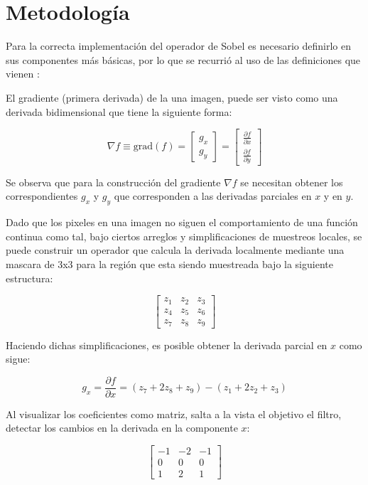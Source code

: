 \documentclass[11pt, letterpaper]{article}
\begin{document}
	\newpage
	
	\section{Metodología}
	
	Para la correcta implementación del operador de Sobel es necesario definirlo en sus componentes más básicas, por lo que se recurrió al uso de las definiciones que vienen \cite{gonzalez2018digital}:
	
	El gradiente (primera derivada) de la una imagen, puede ser visto como una derivada bidimensional que tiene la siguiente forma:
	
	$$\nabla f \equiv \text{grad}(f) = \begin{bmatrix} g_x \\ g_y \end{bmatrix} = \begin{bmatrix} \frac{\partial f}{\partial x} \\ \frac{\partial f}{\partial y} \end{bmatrix}$$
	
	Se observa que para la construcción del gradiente $\nabla f$ se necesitan obtener los correspondientes $g_x$ y $g_y$ que corresponden a las derivadas parciales en $x$ y en $y$.
	
	Dado que los pixeles en una imagen no siguen el comportamiento de una función continua como tal, bajo ciertos arreglos y simplificaciones de muestreos locales, se puede construir un operador que calcula la derivada localmente mediante una mascara de 3x3 para la región que esta siendo muestreada bajo la siguiente estructura:
	
	$$
	\begin{bmatrix}
		z_1 & z_2 & z_3 \\
		z_4 & z_5 & z_6 \\
		z_7 & z_8 & z_9
	\end{bmatrix}
	$$
	
	Haciendo dichas simplificaciones, es posible obtener la derivada parcial en $x$ como sigue:
	
	$$g_x = \frac{\partial f}{\partial x} = (z_7 + 2z_8 + z_9) - (z_1 + 2z_2 + z_3)$$	
	
	Al visualizar los coeficientes como matriz, salta a la vista el objetivo el filtro, detectar los cambios en la derivada en la componente $x$:
	
	$$
	\begin{bmatrix}
		-1 & -2 & -1 \\
		0 & 0 & 0 \\
		1 & 2 & 1
	\end{bmatrix}
	$$
	
\end{document}

